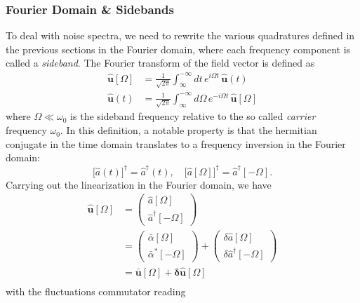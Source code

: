\subsubsection{Fourier Domain \& Sidebands}
To deal with noise spectra, we need to rewrite the various quadratures defined in the previous sections in the Fourier domain, where each frequency component is called a \textit{sideband}. The Fourier transform of the field vector is defined as
\begin{equation}
  \begin{split}
    \mathbf{\hat{u}}[\Omega] &= \frac{1}{\sqrt{2\pi}}\int_{\infty}^{-\infty}  dt \, e^{i\Omega t} \, \mathbf{\hat{u}}(t)\\
\mathbf{\hat{u}}(t) &= \frac{1}{\sqrt{2\pi}}\int_{\infty}^{-\infty}  d\Omega \, e^{-i\Omega t} \, \mathbf{\hat{u}}[\Omega]
  \end{split}
\end{equation}
where $\Omega \ll \omega_0$ is the sideband frequency relative to the so called \textit{carrier} frequency $\omega_0$. In this definition, a notable property is that the hermitian conjugate in the time domain translates to a frequency inversion in the Fourier domain:
\begin{equation}
   \Big[\hat{a}(t)\Big]^{\dagger} = \hat{a}^\dagger(t),  \quad
   \Big[\hat{a}[\Omega]\Big]^{\dagger}  = \hat{a}^\dagger[-\Omega].
\end{equation}
Carrying out the linearization in the Fourier domain, we have
\begin{equation}
  \begin{split}
      \mathbf{\hat{u}}[\Omega] &= \begin{pmatrix} \hat{a}[\Omega] \\ \hat{a}^\dagger[-\Omega] \end{pmatrix}  \\
       & = \begin{pmatrix} \bar{\alpha}[\Omega] \\ \bar{\alpha}^*[-\Omega] \end{pmatrix} + \begin{pmatrix} \delta\hat{a}[\Omega] \\ \delta\hat{a}^\dagger[-\Omega] \end{pmatrix} \\
      & = \mathbf{\bar{u}}[\Omega] + \mathbf{\delta \hat{u}}[\Omega]\\
  \end{split}
\end{equation}
with the fluctuations commutator reading
